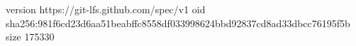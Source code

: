 version https://git-lfs.github.com/spec/v1
oid sha256:981f6cd23d6aa51beabffc8558df033998624bbd92837cd8ad33dbcc76195f5b
size 175330

